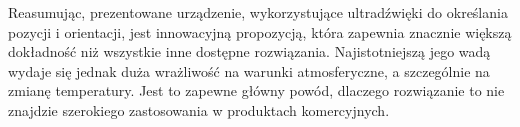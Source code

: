 Reasumując, prezentowane urządzenie, wykorzystujące ultradźwięki do określania pozycji i orientacji,
jest innowacyjną propozycją, która zapewnia znacznie większą dokładność niż wszystkie inne dostępne rozwiązania.
Najistotniejszą jego wadą wydaje się jednak duża wrażliwość na warunki atmosferyczne, a szczególnie na zmianę temperatury.
Jest to zapewne główny powód, dlaczego rozwiązanie to nie znajdzie  szerokiego zastosowania w produktach komercyjnych.



